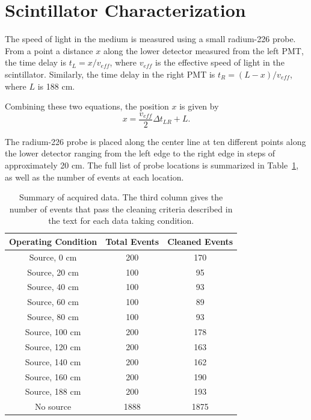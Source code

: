 \section{Scintillator Characterization}

The speed of light in the medium is measured using a small radium-226 probe. From a point a distance $x$ along the lower detector measured from the left PMT, the time delay is $t_L = x/v_{eff}$, where $v_{eff}$ is the effective speed of light in the scintillator. Similarly, the time delay in the right PMT is $t_R = (L-x)/v_{eff}$, where $L$ is 188 cm. 

Combining these two equations, the position $x$ is given by 
\begin{equation}
x=\frac{v_{eff}}{2}\Delta t_{LR} + L. 
\end{equation}

The radium-226 probe is placed along the center line at ten different points along the lower detector ranging from the left edge to the right edge in steps of approximately 20 cm. The full list of probe locations is summarized in Table~\ref{data}, as well as the number of events at each location. 

\begin{table}[hb]
\caption{\label{data} Summary of acquired data. The third column gives the number of events that pass the cleaning criteria described in the text for each data taking condition.}
\begin{tabular}{|c|c|c|}
\hline
Operating Condition & Total Events & Cleaned Events \\
\hline
Source, 0 cm & 200 & 170 \\
\hline
Source, 20 cm & 100 & 95 \\
\hline
Source, 40 cm & 100 & 93 \\
\hline
Source, 60 cm & 100 & 89 \\
\hline
Source, 80 cm & 100 & 93 \\
\hline
Source, 100 cm & 200 & 178 \\
\hline
Source, 120 cm & 200 & 163 \\
\hline
Source, 140 cm & 200 & 162 \\
\hline
Source, 160 cm & 200 & 190 \\
\hline
Source, 188 cm & 200 & 193 \\
\hline
No source & 1888 & 1875 \\
\hline
\end{tabular}
\end{table}

